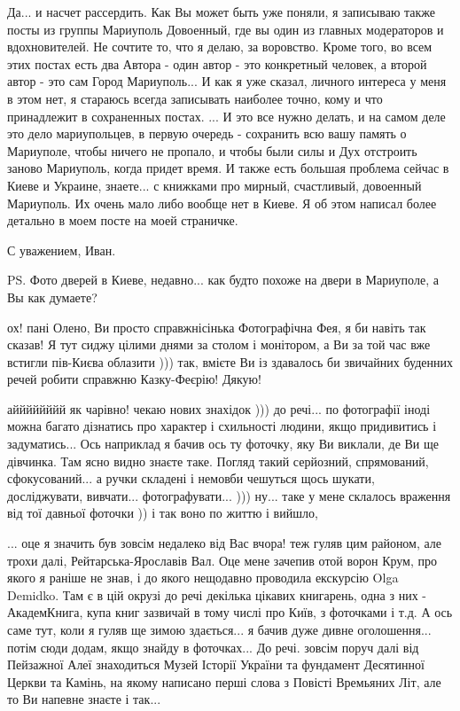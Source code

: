 Да... и насчет рассердить. Как Вы может быть уже поняли, я записываю также
посты из группы Мариуполь Довоенный, где вы один из главных модераторов и
вдохновителей. Не сочтите то, что я делаю, за воровство. Кроме того, во всем
этих постах есть два Автора - один автор - это конкретный человек, а второй
автор - это сам Город Мариуполь... И как я уже сказал, личного интереса у меня
в этом нет, я стараюсь всегда записывать наиболее точно, кому и что принадлежит
в сохраненных постах.  ... И это все нужно делать, и на самом деле это дело
мариупольцев, в первую очередь - сохранить всю вашу память о Мариуполе,  чтобы
ничего не пропало, и чтобы были силы и Дух отстроить заново Мариуполь, когда
придет время.  И также есть большая проблема сейчас в Киеве и Украине,
знаете... с книжками про мирный, счастливый, довоенный Мариуполь. Их очень мало
либо вообще нет в Киеве.  Я об этом написал более детально в моем посте на моей
страничке. 

С уважением, Иван.

PS. Фото дверей в Киеве, недавно... как будто похоже на двери в Мариуполе,
а Вы как думаете?

ох! пані Олено, Ви просто справжнісінька Фотографічна Фея, я би навіть так
сказав! Я тут сиджу цілими днями за столом і монітором, а Ви за той час вже
встигли пів-Києва облазити ))) так, вмієте Ви із здавалось би звичайних
буденних речей робити справжню Казку-Феєрію! Дякую!

айййййййй як чарівно! чекаю нових знахідок ))) до речі... по фотографії іноді
можна багато дізнатись про характер і схильності людини, якщо придивитись і
задуматись...  Ось наприклад я бачив ось ту фоточку, яку Ви виклали, де Ви ще
дівчинка. Там ясно видно знаєте таке. Погляд такий серйозний,
спрямований, сфокусований... а ручки складені і немовби чешуться щось шукати,
досліджувати, вивчати... фотографувати... ))) ну... таке у мене склалось
враження від тої давньої фоточки )) і так воно по життю і вийшло, 


... оце я значить був зовсім недалеко від Вас вчора! теж гуляв цим районом, але
трохи далі, Рейтарська-Ярославів Вал. Оце мене зачепив отой ворон Крум, про
якого я раніше не знав, і до якого нещодавно проводила екскурсію Olga Demidko.
Там є в цій окрузі до речі декілька цікавих книгарень, одна з них -
АкадемКнига, купа книг зазвичай в тому числі про Київ, з фоточками і т.д. А ось
саме тут, коли я гуляв ще зимою здається... я бачив дуже дивне оголошення...
потім сюди додам, якщо знайду в фоточках... До речі. зовсім поруч далі від
Пейзажної Алеї знаходиться Музей Історії України та фундамент Десятинної Церкви
та Камінь, на якому написано перші слова з Повісті Времьяних Літ, але то Ви
напевне знаєте і так...
